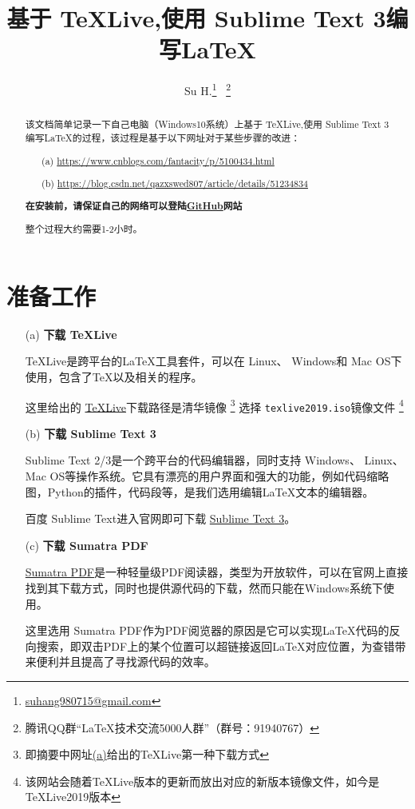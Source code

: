 \documentclass{ctexart}
\title{基于 TeXLive,使用 Sublime Text 3编写{\LaTeX}}
\author{Su H.\thanks{\url{suhang980715@gmail.com}} \ \thanks{腾讯QQ群“{\LaTeX}技术交流5000人群”（群号：91940767）}}
\begin{document}
  
\maketitle

\begin{abstract}
  该文档简单记录一下自己电脑（Windows10系统）上基于 TeXLive,使用 Sublime Text 3编写{\LaTeX}的过程，该过程是基于以下网址对于某些步骤的改进：
  \begin{enumerate}
    \item[(a)]
    \url{https://www.cnblogs.com/fantacity/p/5100434.html}
    \item[(b)]
    \url{https://blog.csdn.net/qazxswed807/article/details/51234834}
  \end{enumerate}

  \textbf{在安装前，请保证自己的网络可以登陆\href{https://github.com/}{GitHub}网站}

  整个过程大约需要1-2小时。
\end{abstract}
% 
\section{准备工作}
% 
\begin{enumerate}[leftmargin=*]
\item[(a)]
\textbf{下载 TeXLive}

TeXLive是跨平台的{\LaTeX}工具套件，可以在 Linux、 Windows和 Mac OS下使用，包含了{\TeX}以及相关的程序。

这里给出的 \href{https://mirrors.tuna.tsinghua.edu.cn/CTAN/systems/texlive/Images/}{TeXLive}下载路径是清华镜像
\footnote{即摘要中网址\href{https://www.cnblogs.com/fantacity/p/5100434.html}{(a)}给出的TeXLive第一种下载方式}
选择 \texttt{texlive2019.iso}镜像文件
\footnote{该网站会随着TeXLive版本的更新而放出对应的新版本镜像文件，如今是TeXLive2019版本}
% 
\item[(b)]
\textbf{下载 Sublime Text 3}

Sublime Text 2/3是一个跨平台的代码编辑器，同时支持 Windows、 Linux、 Mac OS等操作系统。它具有漂亮的用户界面和强大的功能，例如代码缩略图，Python的插件，代码段等，是我们选用编辑{\LaTeX}文本的编辑器。

百度 Sublime Text进入官网即可下载 \href{https://www.sublimetext.com/3}{Sublime Text 3}。
% 
\item[(c)]
\textbf{下载 Sumatra PDF}

\href{https://www.sumatrapdfreader.org/download-free-pdf-viewer.html}{Sumatra PDF}是一种轻量级PDF阅读器，类型为开放软件，可以在官网上直接找到其下载方式，同时也提供源代码的下载，然而只能在Windows系统下使用。

这里选用 Sumatra PDF作为PDF阅览器的原因是它可以实现{\LaTeX}代码的反向搜索，即双击PDF上的某个位置可以超链接返回{\LaTeX}对应位置，为查错带来便利并且提高了寻找源代码的效率。

\end{enumerate}
% 
\end{document}
